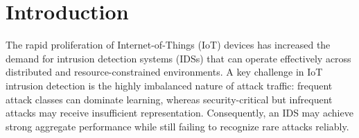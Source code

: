 \documentclass[conference,a4paper]{IEEEtran}
\begin{document}




\section{Introduction}

The rapid proliferation of Internet-of-Things (IoT) devices has increased the
demand for intrusion detection systems (IDSs) that can operate effectively
across distributed and resource-constrained environments. A key challenge in
IoT intrusion detection is the highly imbalanced nature of attack traffic:
frequent attack classes can dominate learning, whereas security-critical but
infrequent attacks may receive insufficient representation. Consequently, an
IDS may achieve strong aggregate performance while still failing to recognize
rare attacks reliably.
\end{document}
